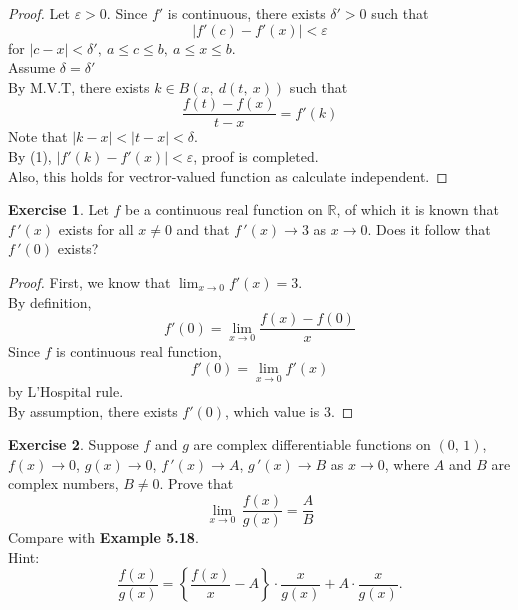 \documentclass[12pt]{book}
\theoremstyle{definition}
\newtheorem{exercise}{Exercise}
\newcommand{\R}{\mathbb{R}}
\begin{document}
	\begin{proof}
		Let $\varepsilon>0$.
		Since $f'$ is continuous, there exists $\delta'>0$ such that
		\begin{equation}
			|f'(c)-f'(x)|<\varepsilon
		\end{equation}
		for $|c-x|<\delta',~a\leq c\leq b,~a\leq x\leq b$.\\
		Assume $\delta=\delta'$\\
		By M.V.T, there exists $k\in B(x,~ d(t,~x))$ such that $$\dfrac{f(t)-f(x)}{t-x}=f'(k)$$
		Note that $|k-x|<|t-x|<\delta$.\\
		By (1), $|f'(k)-f'(x)|<\varepsilon$, proof is completed.\\
		Also, this holds for vectror-valued function as calculate independent.
	\end{proof}
	\newpage
	\begin{exercise}
		Let $f$ be a continuous real function on $\R$, of which it is known that $f\,'(x)$ exists for all $x\neq 0$ and that $f\,'(x)\rightarrow3$ as $x\rightarrow0$. Does it follow that $f\,'(0)$ exists?
	\end{exercise}
	\begin{proof}
		First, we know that $\displaystyle\lim_{x\rightarrow 0} f'(x)=3$.\\
		By definition, $$f'(0)=\displaystyle\lim_{x\rightarrow 0}\dfrac{f(x)-f(0)}{x}$$
		Since $f$ is continuous real function, $$f'(0)=\displaystyle\lim_{x\rightarrow 0}f'(x)$$ by L'Hospital rule.\\
		By assumption, there exists $f'(0)$, which value is $3$.
	\end{proof}
	\newpage
	\begin{exercise}
		Suppose $f$ and $g$ are complex differentiable functions on $(0,\,1)$, $f(x) \rightarrow0$, $g(x)\rightarrow0$, $f\,'(x)\rightarrow A$, $g\,'(x)\rightarrow B$ as $x\rightarrow 0$, where $A$ and $B$ are complex numbers, $B\neq 0$. Prove that
		\begin{equation*}
			\lim_{x\rightarrow 0}\,\dfrac{f(x)}{g(x)}=\dfrac{A}{B}
		\end{equation*}
		Compare with \textbf{Example 5.18}.\\
		Hint:\begin{equation*}
			\dfrac{f(x)}{g(x)}=\left\{\dfrac{f(x)}{x}-A\right\}\cdot \dfrac{x}{g(x)}+A\cdot \dfrac{x}{g(x)}.
		\end{equation*}
	\end{exercise}
\end{document}
